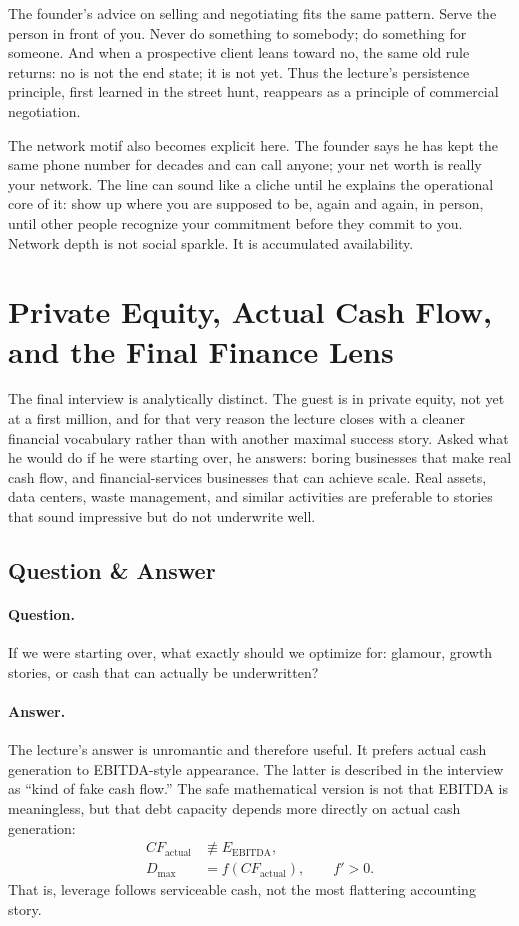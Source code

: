 The founder's advice on selling and negotiating fits the same pattern. Serve the person in front of you. Never do something to somebody; do something for someone. And when a prospective client leans toward no, the same old rule returns: no is not the end state; it is not yet. Thus the lecture's persistence principle, first learned in the street hunt, reappears as a principle of commercial negotiation.

The network motif also becomes explicit here. The founder says he has kept the same phone number for decades and can call anyone; your net worth is really your network. The line can sound like a cliche until he explains the operational core of it: show up where you are supposed to be, again and again, in person, until other people recognize your commitment before they commit to you. Network depth is not social sparkle. It is accumulated availability.

\section{Private Equity, Actual Cash Flow, and the Final Finance Lens}

The final interview is analytically distinct. The guest is in private equity, not yet at a first million, and for that very reason the lecture closes with a cleaner financial vocabulary rather than with another maximal success story. Asked what he would do if he were starting over, he answers: boring businesses that make real cash flow, and financial-services businesses that can achieve scale. Real assets, data centers, waste management, and similar activities are preferable to stories that sound impressive but do not underwrite well.

\subsection{Question \& Answer}

\paragraph{Question.} If we were starting over, what exactly should we optimize for: glamour, growth stories, or cash that can actually be underwritten?

\paragraph{Answer.} The lecture's answer is unromantic and therefore useful. It prefers actual cash generation to EBITDA-style appearance. The latter is described in the interview as ``kind of fake cash flow.'' The safe mathematical version is not that EBITDA is meaningless, but that debt capacity depends more directly on actual cash generation:
\begin{align}
CF_{\text{actual}} &\not\equiv E_{\text{EBITDA}}, \\
D_{\max} &= f(CF_{\text{actual}}), \qquad f' > 0.
\end{align}
That is, leverage follows serviceable cash, not the most flattering accounting story.

